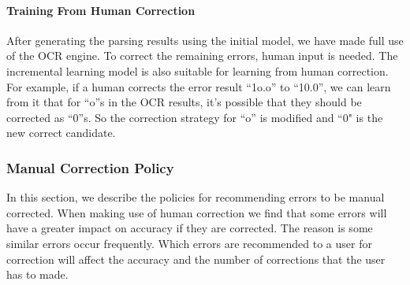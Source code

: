 \paragraph{Training From Human Correction}
After generating the parsing results using the initial model, we have 
made full use of the OCR engine. To correct the remaining errors, 
human input is needed. The incremental learning model is also suitable 
for learning from human correction. 
For example, if a human corrects the error result ``1o.o'' to ``10.0'', 
we can learn from it that for ``o''s in the OCR results, it's possible that 
they should be corrected as ``0''s. So the correction strategy 
for ``o'' is modified and ``0" is the new correct candidate. 

\subsubsection{Manual Correction Policy}
In this section, we describe the policies for recommending 
errors to be manual corrected. When making use of human correction 
we find that some errors will have a greater impact on 
accuracy if they are corrected. The reason is some similar errors 
occur frequently. Which errors are recommended to a user 
for correction will affect the accuracy and the 
number of corrections that the user has to made. 

